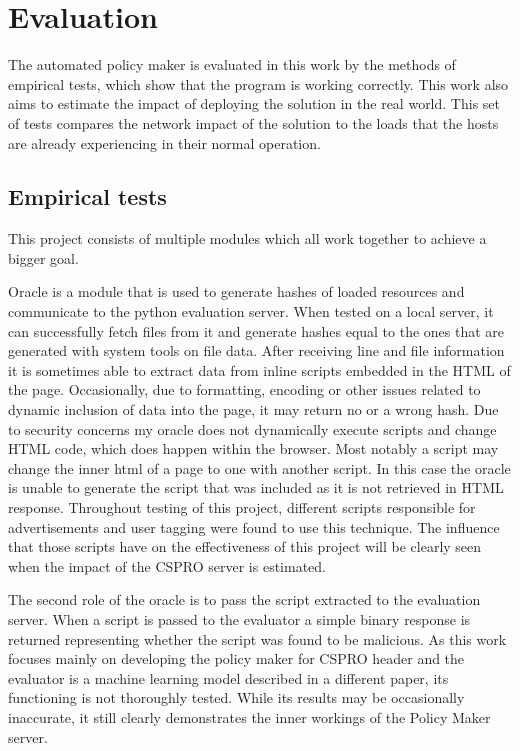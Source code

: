 \chapter{Evaluation}

The automated policy maker is evaluated in this work by the methods of empirical tests, which show that the program is working correctly.
This work also aims to estimate the impact of deploying the solution in the real world.
This set of tests compares the network impact of the solution to the loads that the hosts are already experiencing in their normal operation.

\section{Empirical tests}

This project consists of multiple modules which all work together to achieve a bigger goal.

Oracle is a module that is used to generate hashes of loaded resources and communicate to the python evaluation server.
When tested on a local server, it can successfully fetch files from it and generate hashes equal to the ones that are generated with system tools on file data.
After receiving line and file information it is sometimes able to extract data from inline scripts embedded in the HTML of the page.
Occasionally, due to formatting, encoding or other issues related to dynamic inclusion of data into the page, it may return no or a wrong hash.
Due to security concerns my oracle does not dynamically execute scripts and change HTML code, which does happen within the browser.
Most notably a script may change the inner html of a page to one with another script.
In this case the oracle is unable to generate the script that was included as it is not retrieved in HTML response.
Throughout testing of this project, different scripts responsible for advertisements and user tagging were found to use this technique.
The influence that those scripts have on the effectiveness of this project will be clearly seen when the impact of the CSPRO server is estimated.

The second role of the oracle is to pass the script extracted to the evaluation server.
When a script is passed to the evaluator a simple binary response is returned representing whether the script was found to be malicious.
As this work focuses mainly on developing the policy maker for CSPRO header and the evaluator is a machine learning model described in a different paper, its functioning is not thoroughly tested.
While its results may be occasionally inaccurate, it still clearly demonstrates the inner workings of the Policy Maker server.

